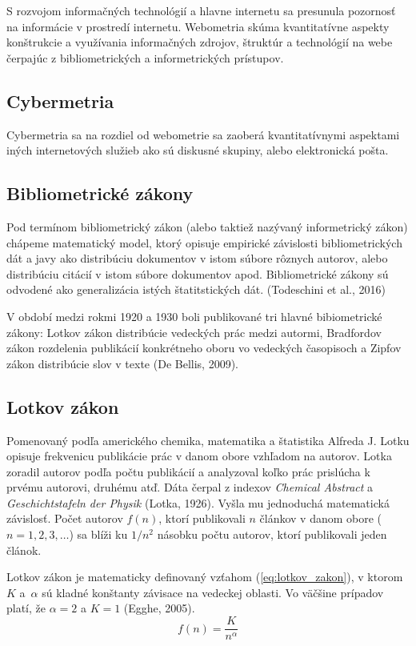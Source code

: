 S rozvojom informačných technológií a hlavne internetu sa presunula pozornosť na
informácie v prostredí internetu.  Webometria skúma kvantitatívne aspekty
konštrukcie a využívania informačných zdrojov, štruktúr a technológií na webe
čerpajúc z bibliometrických a informetrických prístupov.


\subsection{Cybermetria}

Cybermetria sa na rozdiel od webometrie sa zaoberá kvantitatívnymi aspektami
iných internetových služieb ako sú diskusné skupiny, alebo elektronická pošta.


\subsection{Bibliometrické zákony}

Pod termínom bibliometrický zákon (alebo taktiež nazývaný informetrický zákon)
chápeme matematický model, ktorý opisuje empirické závislosti bibliometrických
dát a javy ako distribúciu dokumentov v istom súbore rôznych autorov, alebo
distribúciu citácií v istom súbore dokumentov apod.  Bibliometrické zákony sú
odvodené ako generalizácia istých štatitstických dát.  (Todeschini et al., 2016)

V období medzi rokmi 1920 a 1930 boli publikované tri hlavné bibiometrické
zákony: Lotkov zákon distribúcie vedeckých prác medzi autormi, Bradfordov zákon
rozdelenia publikácií konkrétneho oboru vo vedeckých časopisoch a Zipfov zákon
distribúcie slov v texte (De Bellis, 2009).


\subsection{Lotkov zákon}

Pomenovaný podľa amerického chemika, matematika a štatistika Alfreda J.  Lotku
opisuje frekvenicu publikácie prác v danom obore vzhľadom na autorov.  Lotka
zoradil autorov podľa počtu publikácií a analyzoval koľko prác prislúcha k
prvému autorovi, druhému atď.  Dáta čerpal z indexov {\em Chemical Abstract} a
{\em Geschichtstafeln der Physik} (Lotka, 1926).  Vyšla mu jednoduchá
matematická závislosť.  Počet autorov $f(n)$, ktorí publikovali $n$ článkov v
danom obore ($n = 1, 2, 3, \dots$) sa blíži ku $1/n^2$ násobku počtu autorov,
ktorí publikovali jeden článok.

Lotkov zákon je matematicky definovaný vzťahom (\ref{eq:lotkov_zakon}), v ktorom
$K$ a~$\alpha$ sú kladné konštanty závisace na vedeckej oblasti.  Vo väčšine
prípadov platí, že $\alpha = 2$ a $K = 1$ (Egghe, 2005).
\begin{equation}
\label{eq:lotkov_zakon}
f(n) = \frac{K}{n^\alpha}
\end{equation}

